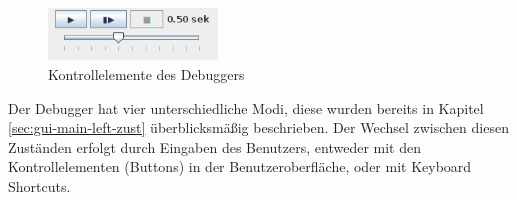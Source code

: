 \begin{figure}[htp]
\centering
\includegraphics[width=0.4\textwidth]{./media/images/gui/debugger/ctrl-elements.png}
\caption{Kontrollelemente des Debuggers}
\label{fig:deb-gui-ctrl}
\end{figure}

Der Debugger hat vier unterschiedliche Modi, diese wurden bereits in Kapitel \ref{sec:gui-main-left-zust} überblicksmäßig beschrieben. Der Wechsel zwischen diesen Zuständen erfolgt durch Eingaben des Benutzers, entweder mit den Kontrollelementen (Buttons) in der Benutzeroberfläche, oder mit Keyboard Shortcuts.

